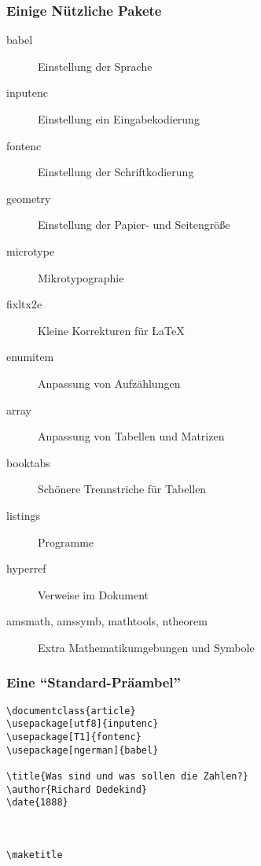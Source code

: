 \begin{frame}
  \frametitle{Einige Nützliche Pakete}

  \onslide<+->

  \begin{description}
  \item[babel] Einstellung der Sprache
  \item[inputenc] Einstellung ein Eingabekodierung
  \item[fontenc] Einstellung der Schriftkodierung
  \item[geometry] Einstellung der Papier- und Seitengröße
  \item[microtype] Mikrotypographie
  \item[fixltx2e] Kleine Korrekturen für \LaTeX
  \item[enumitem] Anpassung von Aufzählungen
  \item[array] Anpassung von Tabellen und Matrizen
  \item[booktabs] Schönere Trennstriche für Tabellen
  \item[listings] Programme
  \item[hyperref] Verweise im Dokument
  \item[amsmath, amssymb, mathtools, ntheorem] Extra Mathematikumgebungen und Symbole
  \end{description}

\end{frame}

\begin{frame}[fragile]
  \frametitle{Eine \enquote{Standard-Präambel}}

  \onslide<+->

\begin{lstlisting}
\documentclass{article}
\usepackage[utf8]{inputenc}
\usepackage[T1]{fontenc}
\usepackage[ngerman]{babel}

\title{Was sind und was sollen die Zahlen?}
\author{Richard Dedekind}
\date{1888}



\maketitle


\end{lstlisting}

\end{frame}

